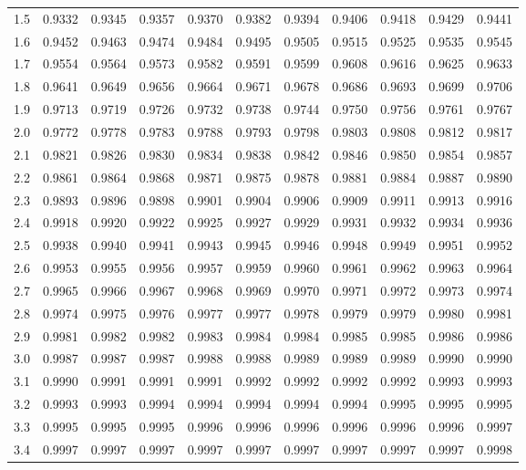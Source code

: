 \begin{frame}
{\begin{tabular}{l|lllllll>{\columncolor{blue}}lll}
1.5 & 0.9332 & 0.9345 & 0.9357 & 0.9370 & 0.9382 & 0.9394 & 0.9406 & 0.9418 & 0.9429 & 0.9441 \\ 
1.6 & 0.9452 & 0.9463 & 0.9474 & 0.9484 & 0.9495 & 0.9505 & 0.9515 & 0.9525 & 0.9535 & 0.9545 \\ 
1.7 & 0.9554 & 0.9564 & 0.9573 & 0.9582 & 0.9591 & 0.9599 & 0.9608 & 0.9616 & 0.9625 & 0.9633 \\ 
1.8 & 0.9641 & 0.9649 & 0.9656 & 0.9664 & 0.9671 & 0.9678 & 0.9686 & 0.9693 & 0.9699 & 0.9706 \\ 
1.9 & 0.9713 & 0.9719 & 0.9726 & 0.9732 & 0.9738 & 0.9744 & 0.9750 & 0.9756 & 0.9761 & 0.9767 \\ 
2.0 & 0.9772 & 0.9778 & 0.9783 & 0.9788 & 0.9793 & 0.9798 & 0.9803 & 0.9808 & 0.9812 & 0.9817 \\ 
2.1 & 0.9821 & 0.9826 & 0.9830 & 0.9834 & 0.9838 & 0.9842 & 0.9846 & 0.9850 & 0.9854 & 0.9857 \\ 
2.2 & 0.9861 & 0.9864 & 0.9868 & 0.9871 & 0.9875 & 0.9878 & 0.9881 & 0.9884 & 0.9887 & 0.9890 \\ 
2.3 & 0.9893 & 0.9896 & 0.9898 & 0.9901 & 0.9904 & 0.9906 & 0.9909 & 0.9911 & 0.9913 & 0.9916 \\ 
2.4 & 0.9918 & 0.9920 & 0.9922 & 0.9925 & 0.9927 & 0.9929 & 0.9931 & 0.9932 & 0.9934 & 0.9936 \\ 
2.5 & 0.9938 & 0.9940 & 0.9941 & 0.9943 & 0.9945 & 0.9946 & 0.9948 & 0.9949 & 0.9951 & 0.9952 \\ 
2.6 & 0.9953 & 0.9955 & 0.9956 & 0.9957 & 0.9959 & 0.9960 & 0.9961 & 0.9962 & 0.9963 & 0.9964 \\ 
2.7 & 0.9965 & 0.9966 & 0.9967 & 0.9968 & 0.9969 & 0.9970 & 0.9971 & 0.9972 & 0.9973 & 0.9974 \\ 
2.8 & 0.9974 & 0.9975 & 0.9976 & 0.9977 & 0.9977 & 0.9978 & 0.9979 & 0.9979 & 0.9980 & 0.9981 \\ 
2.9 & 0.9981 & 0.9982 & 0.9982 & 0.9983 & 0.9984 & 0.9984 & 0.9985 & 0.9985 & 0.9986 & 0.9986 \\ 
3.0 & 0.9987 & 0.9987 & 0.9987 & 0.9988 & 0.9988 & 0.9989 & 0.9989 & 0.9989 & 0.9990 & 0.9990 \\ 
3.1 & 0.9990 & 0.9991 & 0.9991 & 0.9991 & 0.9992 & 0.9992 & 0.9992 & 0.9992 & 0.9993 & 0.9993 \\ 
3.2 & 0.9993 & 0.9993 & 0.9994 & 0.9994 & 0.9994 & 0.9994 & 0.9994 & 0.9995 & 0.9995 & 0.9995 \\ 
3.3 & 0.9995 & 0.9995 & 0.9995 & 0.9996 & 0.9996 & 0.9996 & 0.9996 & 0.9996 & 0.9996 & 0.9997 \\ 
3.4 & 0.9997 & 0.9997 & 0.9997 & 0.9997 & 0.9997 & 0.9997 & 0.9997 & 0.9997 & 0.9997 & 0.9998 
\end{tabular}



}

\end{frame}


